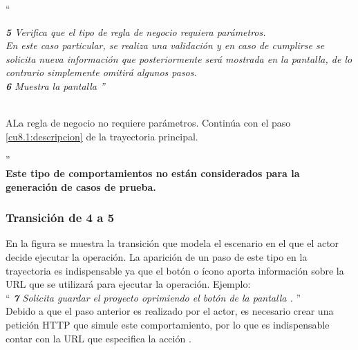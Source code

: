   ``{\it
 {\bf 5} \UCsist Verifica que el tipo de regla de negocio requiera parámetros. \\
 
 En este caso particular, se realiza una validación y en caso de cumplirse se solicita nueva información que posteriormente será mostrada en la pantalla, de lo contrario simplemente omitirá algunos pasos.\\
 
 {\bf 6} \UCsist Muestra la pantalla ''\\\\
 
 \begin{UCtrayectoriaA}{A}{La regla de negocio no requiere parámetros.}
	\UCpaso[] Continúa con el paso \ref{cu8.1:descripcion} de la trayectoria principal.
 \end{UCtrayectoriaA}
     
  }''\\
	
  	{\bf Este tipo de comportamientos no están considerados para la generación de casos de prueba.}
	
 \subsubsection{Transición de 4 a 5} 
 
 En la figura  se muestra la transición que modela el escenario en el que el actor decide ejecutar la operación.
La aparición de un paso de este tipo en la trayectoria es indispensable ya que el botón o ícono aporta información sobre la URL que se utilizará para ejecutar la operación. Ejemplo:\\

``{\it
    {\bf 7} \UCactor Solicita guardar el proyecto oprimiendo el botón  de la pantalla .  
}''\\

	Debido a que el paso anterior es realizado por el actor, es necesario crear una petición HTTP que simule este comportamiento, por lo que es indispensable contar con la URL que especifica la acción .\\
	  
